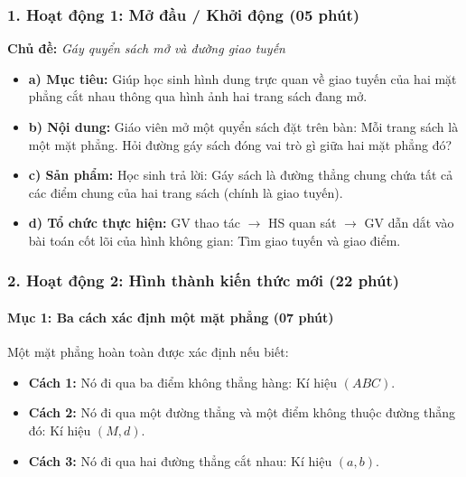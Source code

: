 \documentclass[12pt, a4paper]{article}
\begin{document}
\subsubsection*{1. Hoạt động 1: Mở đầu / Khởi động (05 phút)}
\textbf{Chủ đề:} \textit{Gáy quyển sách mở và đường giao tuyến}
\begin{itemize}
    \item \textbf{a) Mục tiêu:} Giúp học sinh hình dung trực quan về giao tuyến của hai mặt phẳng cắt nhau thông qua hình ảnh hai trang sách đang mở.
    \item \textbf{b) Nội dung:} Giáo viên mở một quyển sách đặt trên bàn: Mỗi trang sách là một mặt phẳng. Hỏi đường gáy sách đóng vai trò gì giữa hai mặt phẳng đó?
    \item \textbf{c) Sản phẩm:} Học sinh trả lời: Gáy sách là đường thẳng chung chứa tất cả các điểm chung của hai trang sách (chính là giao tuyến).
    \item \textbf{d) Tổ chức thực hiện:} GV thao tác $\to$ HS quan sát $\to$ GV dẫn dắt vào bài toán cốt lõi của hình không gian: Tìm giao tuyến và giao điểm.
\end{itemize}

\subsubsection*{2. Hoạt động 2: Hình thành kiến thức mới (22 phút)}

\paragraph{Mục 1: Ba cách xác định một mặt phẳng (07 phút)}
Một mặt phẳng hoàn toàn được xác định nếu biết:
\begin{itemize}
    \item \textbf{Cách 1:} Nó đi qua ba điểm không thẳng hàng: Kí hiệu $(ABC)$.
    \item \textbf{Cách 2:} Nó đi qua một đường thẳng và một điểm không thuộc đường thẳng đó: Kí hiệu $(M, d)$.
    \item \textbf{Cách 3:} Nó đi qua hai đường thẳng cắt nhau: Kí hiệu $(a, b)$.
\end{itemize}
\end{document}
